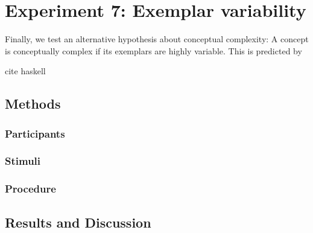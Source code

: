 \section{Experiment 7: Exemplar variability}
Finally, we test an alternative hypothesis about conceptual complexity: A concept is conceptually complex if its exemplars are highly variable. This is predicted by 

cite haskell

\subsection{Methods}
\subsubsection{Participants} 
\subsubsection{Stimuli} 
\subsubsection{Procedure}
\subsection{Results and Discussion}







